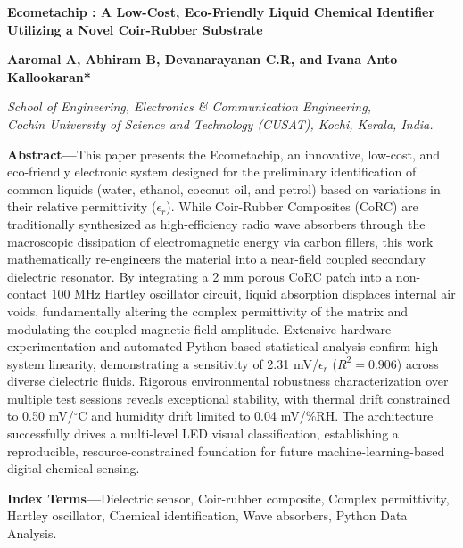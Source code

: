 \documentclass[11pt, a4paper]{article}
\begin{document}
\begin{center}
    {\Large\bfseries Ecometachip : A Low-Cost, Eco-Friendly Liquid Chemical Identifier Utilizing a Novel Coir-Rubber Substrate\par}
    \vspace{0.6cm}
    {\normalsize\bfseries Aaromal A, Abhiram B, Devanarayanan C.R, and Ivana Anto Kallookaran*\par}
    \vspace{0.4cm}
    {\small \textit{School of Engineering, Electronics \& Communication Engineering,\\ Cochin University of Science and Technology (CUSAT), Kochi, Kerala, India.}\par}
\end{center}
\vspace{0.6cm}

\noindent\textbf{Abstract---}This paper presents the Ecometachip, an innovative, low-cost, and eco-friendly electronic system designed for the preliminary identification of common liquids (water, ethanol, coconut oil, and petrol) based on variations in their relative permittivity ($\epsilon_r$). While Coir-Rubber Composites (CoRC) are traditionally synthesized as high-efficiency radio wave absorbers through the macroscopic dissipation of electromagnetic energy via carbon fillers, this work mathematically re-engineers the material into a near-field coupled secondary dielectric resonator. By integrating a 2 mm porous CoRC patch into a non-contact 100 MHz Hartley oscillator circuit, liquid absorption displaces internal air voids, fundamentally altering the complex permittivity of the matrix and modulating the coupled magnetic field amplitude. Extensive hardware experimentation and automated Python-based statistical analysis confirm high system linearity, demonstrating a sensitivity of 2.31 mV/$\epsilon_r$ ($R^2 = 0.906$) across diverse dielectric fluids. Rigorous environmental robustness characterization over multiple test sessions reveals exceptional stability, with thermal drift constrained to 0.50 mV/$^\circ$C and humidity drift limited to 0.04 mV/\%RH. The architecture successfully drives a multi-level LED visual classification, establishing a reproducible, resource-constrained foundation for future machine-learning-based digital chemical sensing.

\vspace{0.4cm}
\noindent\textbf{Index Terms---}Dielectric sensor, Coir-rubber composite, Complex permittivity, Hartley oscillator, Chemical identification, Wave absorbers, Python Data Analysis.
\end{document}
